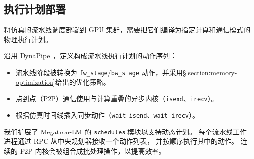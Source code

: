 \subsection{执行计划部署}

将仿真的流水线调度部署到 GPU 集群，需要把它们编译为指定计算和通信模式的物理执行计划。

\sys{} 沿用 DynaPipe~\cite{dynapipe-eurosys24}，定义构成流水线执行计划的动作序列：
\begin{itemize}
    \item 流水线阶段被转换为 \texttt{fw\_stage}/\texttt{bw\_stage} 动作，并采用\S\ref{section:memory-optimization}给出的优化策略。
    \item 点到点（P2P）通信使用与计算重叠的异步内核（\texttt{isend}、\texttt{irecv}）。
    \item 根据仿真时间线插入同步动作（\texttt{wait\_isend}、\newline\texttt{wait\_irecv}）。
\end{itemize}

我们扩展了 Megatron-LM 的 \texttt{schedules} 模块以支持动态计划。
每个流水线工作进程通过 RPC 从中央规划器接收一个动作列表，
并按顺序执行其中的动作。
连续的 P2P 内核会被组合成批处理操作，以提高效率。
